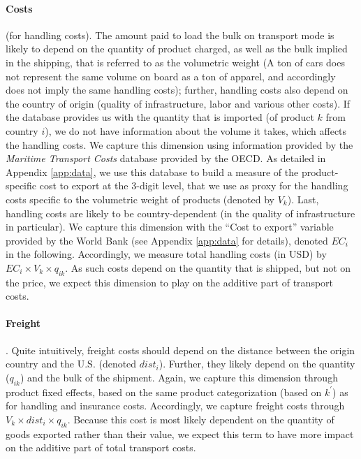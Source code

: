 \documentclass[a4paper,11pt]{article}
\begin{document}
\paragraph{Costs} (for handling costs). The amount paid to load the bulk on transport mode is likely to depend on the quantity of product charged, as well as the bulk implied in the shipping, that is referred to as the volumetric weight (A ton of cars does not represent the same volume on board as a ton of apparel, and accordingly does not imply the same handling costs); further, handling costs also depend on the country of origin (quality of infrastructure, labor and various other costs). If the database provides us with the quantity that is imported (of product $k$ from country $i$), we do not have information about the volume it takes, which affects the handling costs. We capture this dimension using information provided by the \textit{Maritime Transport Costs} database provided by the OECD. As detailed in Appendix \ref{app:data}, we use this database to build a measure of the product-specific cost to export at the 3-digit level, that we use as proxy for the handling costs specific to the volumetric weight of products (denoted by $V_{k}$). Last, handling costs are likely to be country-dependent (in the quality of infrastructure in particular). We capture this dimension with the ``Cost to export'' variable provided by the World Bank (see Appendix \ref{app:data} for details), denoted $EC_{i}$ in the following. Accordingly, we measure total handling costs (in USD) by $EC_i\times V_{k}\times q_{ik}$. As such costs depend on the quantity that is shipped, but not on the price, we expect this dimension to play on the additive part of transport costs.

 \paragraph{Freight}. Quite intuitively, freight costs should depend on the distance between the origin country and the U.S. (denoted $dist_i$). Further, they likely depend on the quantity ($q_{ik}$) and the bulk of the shipment. Again, we capture this dimension through product fixed effects, based on the same product categorization (based on $k^\prime$) as for handling and insurance costs. Accordingly, we capture freight costs through $V_{k}\times dist_i\times q_{ik}$. Because this cost is most likely dependent on the quantity of goods exported rather than their value, we expect this term to have more impact on the additive part of total transport costs.
\end{document}
